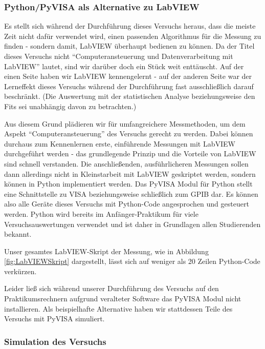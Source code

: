 
\subsubsection*{Python/PyVISA als Alternative zu LabVIEW}

Es stellt sich während der Durchführung dieses Versuchs heraus, dass die meiste Zeit nicht dafür verwendet wird, einen passenden Algorithmus für die Messung zu finden - sondern damit, LabVIEW überhaupt bedienen zu können.
Da der Titel dieses Versuchs nicht \enquote{Computeransteuerung und Datenverarbeitung mit LabVIEW} lautet, sind wir darüber doch ein Stück weit enttäuscht.
Auf der einen Seite haben wir LabVIEW kennengelernt - auf der anderen Seite war der Lerneffekt dieses Versuchs während der Durchführung fast ausschließlich darauf beschränkt.
(Die Auswertung mit der statistischen Analyse beziehungsweise den Fits sei unabhängig davon zu betrachten.)

Aus diesem Grund plädieren wir für umfangreichere Messmethoden, um dem Aspekt \enquote{Computeransteuerung} des Versuchs gerecht zu werden.
Dabei können durchaus zum Kennenlernen erste, einführende Messungen mit LabVIEW durchgeführt werden - das grundlegende Prinzip und die Vorteile von LabVIEW sind schnell verstanden.
Die anschließenden, ausführlicheren Messungen sollen dann allerdings nicht in Kleinstarbeit mit LabVIEW geskriptet werden, sondern können in Python implementiert werden.
Das PyVISA Modul für Python stellt eine Schnittstelle zu VISA beziehungsweise schließlich zum GPIB dar.
Es können also alle Geräte dieses Versuchs mit Python-Code angesprochen und gesteuert werden.
Python wird bereits im Anfänger-Praktikum für viele Versuchsauswertungen verwendet und ist daher in Grundlagen allen Studierenden bekannt.

Unser gesamtes LabVIEW-Skript der Messung, wie in Abbildung \ref{fig:LabVIEWSkript} dargestellt, lässt sich auf weniger als 20 Zeilen Python-Code verkürzen.


Leider ließ sich während unserer Durchführung des Versuchs auf den Praktikumsrechnern aufgrund veralteter Software das PyVISA Modul nicht installieren.
Als beispielhafte Alternative haben wir stattdessen Teile des Versuchs mit PyVISA simuliert.

\subsubsection*{Simulation des Versuchs}

